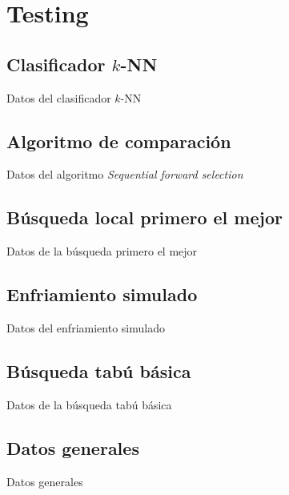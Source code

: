 \documentclass[a4paper, 11pt, titlepage]{article}
\begin{document}
    \maketitle

    \tableofcontents
    \newpage


    \section{Testing}

    \subsection{Clasificador $k$-NN}
    \begin{table}[!htb]
        \maketable{\dataKNN}
        \caption{Datos del clasificador $k$-NN}
        \label{knn}
    \end{table}


    \subsection{Algoritmo de comparación}
    \begin{table}[!htb]
        \maketable{\dataSFS}
        \caption{Datos del algoritmo \emph{Sequential forward selection}}
        \label{sfs}
    \end{table}


    \subsection{Búsqueda local primero el mejor}
    \begin{table}[!htb]
        \maketable{\dataBF}
        \caption{Datos de la búsqueda primero el mejor}
        \label{bf}
    \end{table}


    \subsection{Enfriamiento simulado}
    \begin{table}[!htb]
        \maketable{\dataSA}
        \caption{Datos del enfriamiento simulado}
        \label{sa}
    \end{table}


    \subsection{Búsqueda tabú básica}
    \begin{table}[!htb]
        \maketable{\dataTS}
        \caption{Datos de la búsqueda tabú básica}
        \label{ts}
    \end{table}


    \subsection{Datos generales}
    \begin{table}[!htb]
        \maketablemean{\dataMedias}
        \caption{Datos generales}
        \label{medias}
    \end{table}
\end{document}
